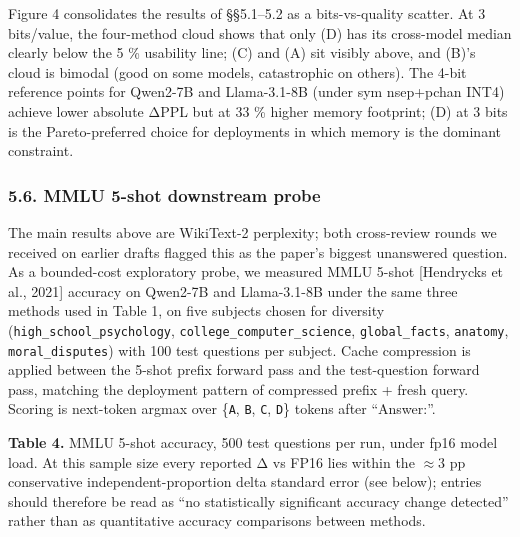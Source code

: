 \documentclass[
]{article}
\begin{document}
Figure 4 consolidates the results of §§5.1--5.2 as a bits-vs-quality
scatter. At 3 bits/value, the four-method cloud shows that only (D) has
its cross-model median clearly below the 5 \% usability line; (C) and
(A) sit visibly above, and (B)'s cloud is bimodal (good on some models,
catastrophic on others). The 4-bit reference points for Qwen2-7B and
Llama-3.1-8B (under sym nsep+pchan INT4) achieve lower absolute ΔPPL but
at 33 \% higher memory footprint; (D) at 3 bits is the Pareto-preferred
choice for deployments in which memory is the dominant constraint.

\subsubsection{5.6. MMLU 5-shot downstream
probe}\label{mmlu-5-shot-downstream-probe}

The main results above are WikiText-2 perplexity; both cross-review
rounds we received on earlier drafts flagged this as the paper's biggest
unanswered question. As a bounded-cost exploratory probe, we measured
MMLU 5-shot {[}Hendrycks et al., 2021{]} accuracy on Qwen2-7B and
Llama-3.1-8B under the same three methods used in Table 1, on five
subjects chosen for diversity (\texttt{high\_school\_psychology},
\texttt{college\_computer\_science}, \texttt{global\_facts},
\texttt{anatomy}, \texttt{moral\_disputes}) with 100 test questions per
subject. Cache compression is applied between the 5-shot prefix forward
pass and the test-question forward pass, matching the deployment pattern
of compressed prefix + fresh query. Scoring is next-token argmax over
\{\texttt{A}, \texttt{B}, \texttt{C}, \texttt{D}\} tokens after
``Answer:''.

\textbf{Table 4.} MMLU 5-shot accuracy, 500 test questions per run,
under fp16 model load. At this sample size every reported Δ vs FP16 lies
within the \(\approx 3\) pp conservative independent-proportion delta
standard error (see below); entries should therefore be read as ``no
statistically significant accuracy change detected'' rather than as
quantitative accuracy comparisons between methods.
\end{document}
